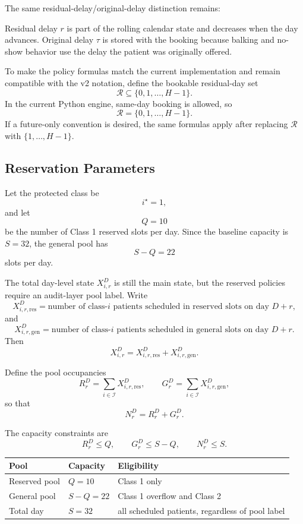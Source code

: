 \documentclass[11pt]{article}
\begin{document}
The same residual-delay/original-delay distinction remains:
\begin{keybox}[title={Residual Delay vs. Original Delay}]
Residual delay \(r\) is part of the rolling calendar state and decreases when the day advances.
Original delay \(\tau\) is stored with the booking because balking and no-show behavior use the delay
the patient was originally offered.
\end{keybox}

To make the policy formulas match the current implementation and remain compatible with the v2
notation, define the bookable residual-day set
\[
\mathcal R\subseteq\{0,1,\dots,H-1\}.
\]
In the current Python engine, same-day booking is allowed, so
\[
\mathcal R=\{0,1,\dots,H-1\}.
\]
If a future-only convention is desired, the same formulas apply after replacing \(\mathcal R\) with
\(\{1,\dots,H-1\}\).

\subsection{Reservation Parameters}

Let the protected class be
\[
i^\star=1,
\]
and let
\[
Q=10
\]
be the number of Class 1 reserved slots per day. Since the baseline capacity is \(S=32\), the general
pool has
\[
S-Q=22
\]
slots per day.

The total day-level state \(X_{i,r}^{D}\) is still the main state, but the reserved policies require
an audit-layer pool label. Write
\[
X_{i,r,\mathrm{res}}^{D}
=
\text{number of class-}i\text{ patients scheduled in reserved slots on day }D+r,
\]
and
\[
X_{i,r,\mathrm{gen}}^{D}
=
\text{number of class-}i\text{ patients scheduled in general slots on day }D+r.
\]
Then
\[
X_{i,r}^{D}
=
X_{i,r,\mathrm{res}}^{D}
+
X_{i,r,\mathrm{gen}}^{D}.
\]

Define the pool occupancies
\[
R_r^D=\sum_{i\in\mathcal I}X_{i,r,\mathrm{res}}^{D},
\qquad
G_r^D=\sum_{i\in\mathcal I}X_{i,r,\mathrm{gen}}^{D},
\]
so that
\[
N_r^D=R_r^D+G_r^D.
\]

The capacity constraints are
\[
R_r^D\le Q,
\qquad
G_r^D\le S-Q,
\qquad
N_r^D\le S.
\]

\begin{examplebox}[title={Daily Capacity Split for the Implemented Strategy}]
\begin{center}
\small
\renewcommand{\arraystretch}{1.35}
\begin{tabular}{L{0.24\textwidth} L{0.22\textwidth} L{0.42\textwidth}}
\toprule
\textbf{Pool} & \textbf{Capacity} & \textbf{Eligibility} \\
\midrule
Reserved pool & \(Q=10\) & Class 1 only \\
\addlinespace
General pool & \(S-Q=22\) & Class 1 overflow and Class 2 \\
\addlinespace
Total day & \(S=32\) & all scheduled patients, regardless of pool label \\
\bottomrule
\end{tabular}
\normalsize
\end{center}
\end{examplebox}
\end{document}
